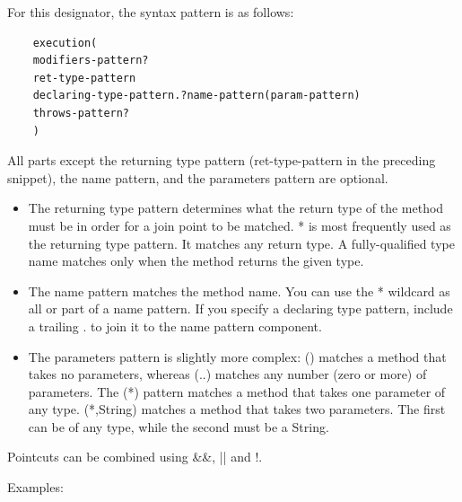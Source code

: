 \documentclass{scrartcl}
\begin{document}
For this designator, the syntax pattern is as follows:

\begin{lstlisting}
    execution(
    modifiers-pattern?
    ret-type-pattern
    declaring-type-pattern.?name-pattern(param-pattern)
    throws-pattern?
    )
\end{lstlisting}

All parts except the returning type pattern (ret-type-pattern in the preceding snippet), the name pattern, and the parameters pattern are optional.

\begin{itemize}
    \item The returning type pattern determines what the return type of the method must be in order for a join point to be matched. * is most frequently used as the returning type pattern. It matches any return type. A fully-qualified type name matches only when the method returns the given type.
    \item  The name pattern matches the method name. You can use the * wildcard as all or part of a name pattern. If you specify a declaring type pattern, include a trailing . to join it to the name pattern component.
    \item The parameters pattern is slightly more complex: () matches a method that takes no parameters, whereas (..) matches any number (zero or more) of parameters. The (*) pattern matches a method that takes one parameter of any type. (*,String) matches a method that takes two parameters. The first can be of any type, while the second must be a String.

\end{itemize}

Pointcuts can be combined using \&\&, || and !.

Examples:
\end{document}
